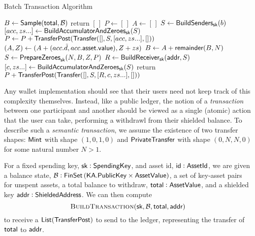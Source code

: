\begin{algorithm*}
\caption{Batch Transaction Algorithm}
\begin{algorithmic}
        \State $B \gets {\textsf{Sample}}({\textsf{total}}, \mathcal{B})$  
            \State \textsf{return} $[\,]$ 
        \EndIf
        \State $P \gets [\,]$ 
         
            \State $A \gets [\,]$
             
                \State $S \gets {\textsf{BuildSenders}}_{\textsf{sk}}(b)$
                \State $[acc, zs...] \gets {\textsf{BuildAccumulatorAndZeroes}}_{\textsf{sk}}(S)$ 
                \State $P \gets P + {\textsf{TransferPost}}({\textsf{Transfer}}([], S, [acc, zs...], []))$
                \State $(A, Z) \gets (A + (acc.\tilde{d}, acc.{\textsf{asset}}.{\textsf{value}}), Z + zs)$ 
            \EndFor
            \State $B \gets A + {\textsf{remainder}}(B, N)$
        \EndWhile
        \State $S \gets {\textsf{PrepareZeroes}}_{\textsf{sk}}(N, B, Z, P)$ 
        \State $R \gets {\textsf{BuildReceiver}}_{\textsf{sk}}({\textsf{addr}}, S)$
        \State $[c, zs...] \gets {\textsf{BuildAccumulatorAndZeroes}}_{\textsf{sk}}(S)$
        \State \textsf{return} $P + {\textsf{TransferPost}}({\textsf{Transfer}}([], S, [R, c, zs...], []))$
    \EndProcedure
\end{algorithmic}
\end{algorithm*}

Any wallet implementation should see that their users need not keep track of this complexity themselves. Instead, like a public ledger, the notion of a \emph{transaction} between one participant and another should be viewed as a single (atomic) action that the user can take, performing a withdrawl from their shielded balance. To describe such a \emph{semantic transaction}, we assume the existence of two transfer shapes\footnotemark{}: ${\textsf{Mint}}$ with shape $(1, 0, 1, 0)$ and ${\textsf{PrivateTransfer}}$ with shape $(0, N, N, 0)$ for some natural number $N > 1$.


For a fixed spending key, ${\textsf{sk}} : {\textsf{SpendingKey}}$, and asset id, ${\textsf{id}} : {\textsf{AssetId}}$, we are given a balance state, $\mathcal{B} : {\textsf{FinSet}}\left({\textsf{KA}}.{\textsf{PublicKey}} \times {\textsf{AssetValue}}\right)$, a set of key-asset pairs for unspent assets, a total balance to withdraw, ${\textsf{total}} : {\textsf{AssetValue}}$, and a shielded key ${\textsf{addr}} : {\textsf{ShieldedAddress}}$. We can then compute 
\[\textsc{BuildTransaction}({\textsf{sk}}, \mathcal{B}, {\textsf{total}}, {\textsf{addr}})\]
to receive a ${\textsf{List}}({\textsf{TransferPost}})$ to send to the ledger, representing the transfer of ${\textsf{total}}$ to ${\textsf{addr}}$.

